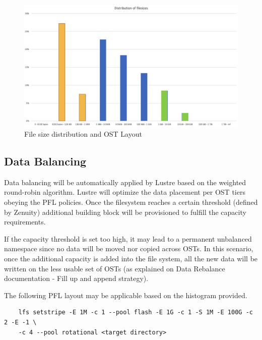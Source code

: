 \documentclass{article}
\begin{document}
\begin{figure}
    \centering
    \includegraphics[scale=0.50]{zen-histogram-color.png}
    \caption{File size distribution and OST Layout}
    \label{fig:file-size distribution and OST layout}
\end{figure}

\subsection{Data Balancing}
Data balancing will be automatically applied by Lustre based on the weighted round-robin algorithm. Lustre will optimize the data placement per OST tiers obeying the PFL policies. Once the filesystem reaches a certain threshold (defined by Zenuity) additional building block will be provisioned to fulfill the capacity requirements. 

If the capacity threshold is set too high, it may lead to a permanent unbalanced namespace since no data will be moved nor copied across OSTs. In this scenario, once the additional capacity is added into the file system, all the new data will be written on the less usable set of OSTs (as explained on Data Rebalance documentation - Fill up and append strategy).

The following PFL layout may be applicable based on the histogram provided. 

\begin{verbatim}
    lfs setstripe -E 1M -c 1 --pool flash -E 1G -c 1 -S 1M -E 100G -c 2 -E -1 \
    -c 4 --pool rotational <target directory>
\end{verbatim}
\end{document}
